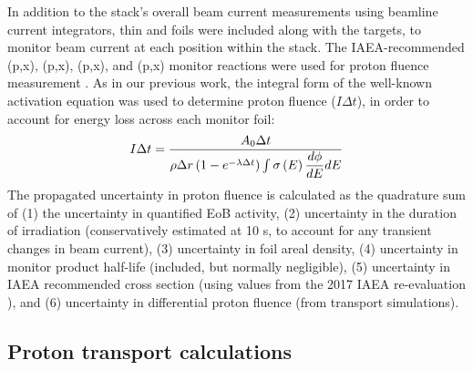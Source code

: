 In addition to the stack's overall beam current measurements using  beamline current integrators, thin  and  foils were included along with the  targets, 
to monitor beam current at each position within the stack.
The IAEA-recommended (p,x), (p,x),  (p,x), and (p,x) monitor reactions were used for  proton fluence measurement 
\cite{Hermanne2018}.
As in our previous work, the integral form of the well-known activation equation was used to  determine proton fluence ($I \Delta t $),
in order to account for energy loss across each monitor foil:
\begin{equation}
I \Delta t = \dfrac{A_0 \Delta t}{\rho \Delta r \left( 1-e^{-\lambda \Delta t}\right) \int \sigma\left( E\right) \dfrac{d\phi}{dE} dE}
\end{equation}
The propagated uncertainty in proton fluence is calculated as the quadrature sum of (1) the uncertainty in quantified EoB activity, (2) uncertainty in the duration of irradiation (conservatively estimated at 10 s, to account for any transient changes in beam current), (3) uncertainty in foil areal density, (4) uncertainty in monitor product half-life (included, but normally negligible), (5) uncertainty in IAEA recommended cross section (using values  from the 2017 IAEA re-evaluation  \cite{Hermanne2018}), and (6) uncertainty in differential proton fluence (from transport simulations).






\subsection{\label{sec:proton_transport_fe}Proton transport calculations}

